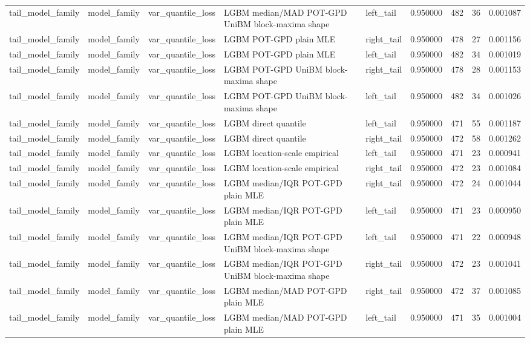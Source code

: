 \begin{tabular}{lllllrrrr}
tail\_model\_family & model\_family & var\_quantile\_loss & LGBM median/MAD POT-GPD UniBM block-maxima shape & left\_tail & 0.950000 & 482 & 36 & 0.001087 \\
tail\_model\_family & model\_family & var\_quantile\_loss & LGBM POT-GPD plain MLE & right\_tail & 0.950000 & 478 & 27 & 0.001156 \\
tail\_model\_family & model\_family & var\_quantile\_loss & LGBM POT-GPD plain MLE & left\_tail & 0.950000 & 482 & 34 & 0.001019 \\
tail\_model\_family & model\_family & var\_quantile\_loss & LGBM POT-GPD UniBM block-maxima shape & right\_tail & 0.950000 & 478 & 28 & 0.001153 \\
tail\_model\_family & model\_family & var\_quantile\_loss & LGBM POT-GPD UniBM block-maxima shape & left\_tail & 0.950000 & 482 & 34 & 0.001026 \\
tail\_model\_family & model\_family & var\_quantile\_loss & LGBM direct quantile & left\_tail & 0.950000 & 471 & 55 & 0.001187 \\
tail\_model\_family & model\_family & var\_quantile\_loss & LGBM direct quantile & right\_tail & 0.950000 & 472 & 58 & 0.001262 \\
tail\_model\_family & model\_family & var\_quantile\_loss & LGBM location-scale empirical & left\_tail & 0.950000 & 471 & 23 & 0.000941 \\
tail\_model\_family & model\_family & var\_quantile\_loss & LGBM location-scale empirical & right\_tail & 0.950000 & 472 & 23 & 0.001084 \\
tail\_model\_family & model\_family & var\_quantile\_loss & LGBM median/IQR POT-GPD plain MLE & right\_tail & 0.950000 & 472 & 24 & 0.001044 \\
tail\_model\_family & model\_family & var\_quantile\_loss & LGBM median/IQR POT-GPD plain MLE & left\_tail & 0.950000 & 471 & 23 & 0.000950 \\
tail\_model\_family & model\_family & var\_quantile\_loss & LGBM median/IQR POT-GPD UniBM block-maxima shape & left\_tail & 0.950000 & 471 & 22 & 0.000948 \\
tail\_model\_family & model\_family & var\_quantile\_loss & LGBM median/IQR POT-GPD UniBM block-maxima shape & right\_tail & 0.950000 & 472 & 23 & 0.001041 \\
tail\_model\_family & model\_family & var\_quantile\_loss & LGBM median/MAD POT-GPD plain MLE & right\_tail & 0.950000 & 472 & 37 & 0.001085 \\
tail\_model\_family & model\_family & var\_quantile\_loss & LGBM median/MAD POT-GPD plain MLE & left\_tail & 0.950000 & 471 & 35 & 0.001004 \\

\end{tabular}
